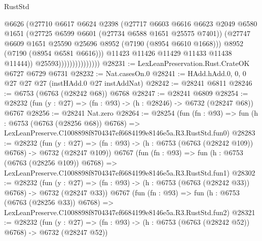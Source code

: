 \begin{lexlean}{RustStd}
\begin{coremodule}
                                    @6626
                                    (@27710
                                      @6617
                                      @6624
                                      @2398
                                      (@27717
                                        @6603
                                        @6616
                                        @6623
                                        @2049
                                        @6580
                                        @1651
                                        (@27725 @6599 @6601 (@27734 @6588 @1651 @25575 @7401))
                                        (@27747
                                          @6609
                                          @1651
                                          @25590
                                          @25696
                                          @8952
                                          (@7190 (@8954 @6610 @1668)))
                                        @8952
                                        (@7190 (@8954 @6581 @6616)))
                                      @11423
                                      @11426
                                      @11429
                                      @11433
                                      @11438
                                      @11444))
                                  @25593)))))))))))))))
@28231 := LexLeanPreservation.Rust.CrateOK @6727 @6729 @6731
@28232 := Nat.casesOn.{0}
@28241 := HAdd.hAdd.{0, 0, 0} @27 @27 @27 (instHAdd.{0} @27 instAddNat)
@28242 := @28241 @6811
@28246 := @6753 (@6763 (@28242 @68)) @6768
@28247 := @28241 @6809
@28254 := @28232 (fun (y : @27) => (fn : @93) -> (h : @28246) -> @6732 (@28247 @68)) @6767
@28256 := @28241 Nat.zero
@28264 := @28254
    (fun (fn : @93) =>
    fun (h : @6753 (@6763 (@28256 @68)) @6768) =>
    LexLeanPreserve.C1008898f8704347ef6684199e8146e5a.R3.RustStd.fun0)
@28283 := @28232
    (fun (y : @27) => (fn : @93) -> (h : @6753 (@6763 (@28242 @109)) @6768) -> @6732 (@28247 @109))
    @6767
    (fun (fn : @93) =>
    fun (h : @6753 (@6763 (@28256 @109)) @6768) =>
    LexLeanPreserve.C1008898f8704347ef6684199e8146e5a.R3.RustStd.fun1)
@28302 := @28232
    (fun (y : @27) => (fn : @93) -> (h : @6753 (@6763 (@28242 @33)) @6768) -> @6732 (@28247 @33))
    @6767
    (fun (fn : @93) =>
    fun (h : @6753 (@6763 (@28256 @33)) @6768) =>
    LexLeanPreserve.C1008898f8704347ef6684199e8146e5a.R3.RustStd.fun2)
@28321 := @28232
    (fun (y : @27) => (fn : @93) -> (h : @6753 (@6763 (@28242 @52)) @6768) -> @6732 (@28247 @52))

\end{coremodule}
\end{lexlean}
